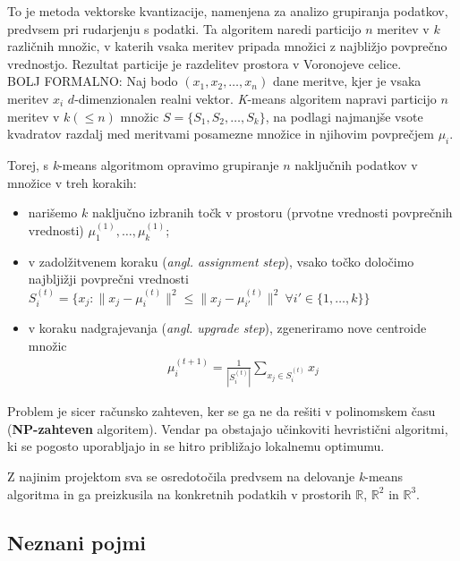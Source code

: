 \documentclass[11pt, a4paper]{article}
\begin{document}
\noindent To je metoda vektorske kvantizacije, namenjena za analizo grupiranja podatkov, predvsem pri rudarjenju s podatki. Ta algoritem naredi particijo $n$ meritev v $k$ različnih množic, v katerih vsaka meritev pripada množici z najbližjo povprečno vrednostjo. Rezultat particije je razdelitev prostora v Voronojeve celice. \\
\noindent BOLJ FORMALNO: Naj bodo $(x_1, x_2, \ldots,x_n)$ dane meritve, kjer je vsaka meritev $x_i$ $d$-dimenzionalen realni vektor. \textsl{K}-means algoritem napravi particijo $n$ meritev v $k  (\leq n)$ množic $S= \{S_1, S_2, \ldots, S_k\}$, na podlagi najmanjše vsote kvadratov razdalj med meritvami posamezne množice in njihovim povprečjem $\mu_i$.

\vspace{0.5 cm}

\noindent Torej, s \textsl{k}-means algoritmom opravimo grupiranje $n$ naključnih podatkov v množice v treh korakih:
\begin{itemize}
	\item narišemo $k$ naključno izbranih točk v prostoru (prvotne vrednosti povprečnih vrednosti) $\mu_1^{(1)}, \dots, \mu_k^{(1)}$;
	\item v zadolžitvenem koraku (\textsl{angl. assignment step}), vsako točko določimo najbljižji povprečni vrednosti \\
$S_i^{(t)} = \{x_j:  \| x_j - \mu_i^{(t)} \|^2 \le  \| x_j - \mu_{i'}^{(t)} \|^2\ \forall  i' \in \{1, \ldots, k\} \}$
	\item v koraku nadgrajevanja (\textsl{angl. upgrade step}), zgeneriramo nove centroide množic
\begin{align*}
 \mu_i^{(t+1)} = \frac{1}{ | S_i^{(t)}| } \sum_{x_j \in S_i^{(t)}} x_j 
\end{align*}
\end{itemize}

\noindent Problem je sicer računsko zahteven, ker se ga ne da rešiti v polinomskem času (\textbf{NP-zahteven} algoritem). Vendar pa obstajajo učinkoviti hevristični algoritmi, ki se pogosto uporabljajo in se hitro približajo lokalnemu optimumu. 

\vspace{0,5cm}

\noindent Z najinim projektom sva se osredotočila predvsem na delovanje \textsl{k}-means algoritma in ga preizkusila na konkretnih podatkih v prostorih $\mathbb{R}$, $\mathbb{R}^2$ in $\mathbb{R}^3$.

\subsection{Neznani pojmi}
\end{document}
